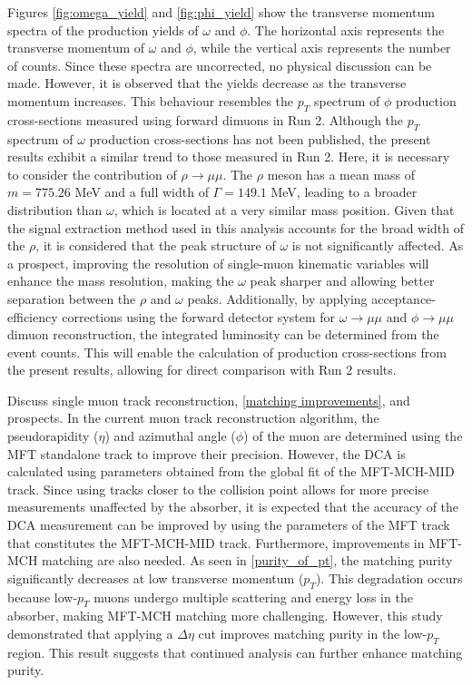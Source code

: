     Figures \ref{fig:omega_yield} and \ref{fig:phi_yield} show the transverse momentum spectra of the production yields of $\omega$ and $\phi$. The horizontal axis represents the transverse momentum of $\omega$ and $\phi$, while the vertical axis represents the number of counts.
    Since these spectra are uncorrected, no physical discussion can be made. However, it is observed that the yields decrease as the transverse momentum increases. This behaviour resembles the $p_T$ spectrum of $\phi$ production cross-sections measured using forward dimuons in Run 2. Although the $p_T$ spectrum of $\omega$ production cross-sections has not been published, the present results exhibit a similar trend to those measured in Run 2.  
    Here, it is necessary to consider the contribution of $\rho \rightarrow \mu\mu$. The $\rho$ meson has a mean mass of $m = 775.26$ MeV and a full width of $\Gamma = 149.1$ MeV, leading to a broader distribution than $\omega$, which is located at a very similar mass position. Given that the signal extraction method used in this analysis accounts for the broad width of the $\rho$, it is considered that the peak structure of $\omega$ is not significantly affected.  
    As a prospect, improving the resolution of single-muon kinematic variables will enhance the mass resolution, making the $\omega$ peak sharper and allowing better separation between the $\rho$ and $\omega$ peaks. Additionally, by applying acceptance-efficiency corrections using the forward detector system for $\omega \rightarrow \mu\mu$ and $\phi \rightarrow \mu\mu$ dimuon reconstruction, the integrated luminosity can be determined from the event counts. This will enable the calculation of production cross-sections from the present results, allowing for direct comparison with Run 2 results.
   
   
    Discuss single muon track reconstruction, \ref{matching improvements}, and prospects. In the current muon track reconstruction algorithm, the pseudorapidity (\(\eta\)) and azimuthal angle (\(\phi\)) of the muon are determined using the MFT standalone track to improve their precision. However, the DCA is calculated using parameters obtained from the global fit of the MFT-MCH-MID track. Since using tracks closer to the collision point allows for more precise measurements unaffected by the absorber, it is expected that the accuracy of the DCA measurement can be improved by using the parameters of the MFT track that constitutes the MFT-MCH-MID track. Furthermore, improvements in MFT-MCH matching are also needed. As seen in \ref{purity_of_pt}, the matching purity significantly decreases at low transverse momentum (\( p_T \)). This degradation occurs because low-\( p_T \) muons undergo multiple scattering and energy loss in the absorber, making MFT-MCH matching more challenging. However, this study demonstrated that applying a \( \Delta \eta \) cut improves matching purity in the low-\( p_T \) region. This result suggests that continued analysis can further enhance matching purity.
   
